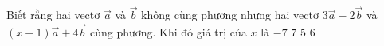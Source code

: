 
\begin{ex}%
	Biết rằng hai vectơ $\overrightarrow a $ và $\overrightarrow b $ không cùng phương nhưng hai vectơ $ 3\overrightarrow a-2\overrightarrow b $ và $ (x+1)\overrightarrow a+4\overrightarrow b $ cùng phương. Khi đó giá trị của $ x$ là
	\choice
	{\True $-7$}
	{$ 7$}
	{$ 5$}
	{$ 6$}
\end{ex}


